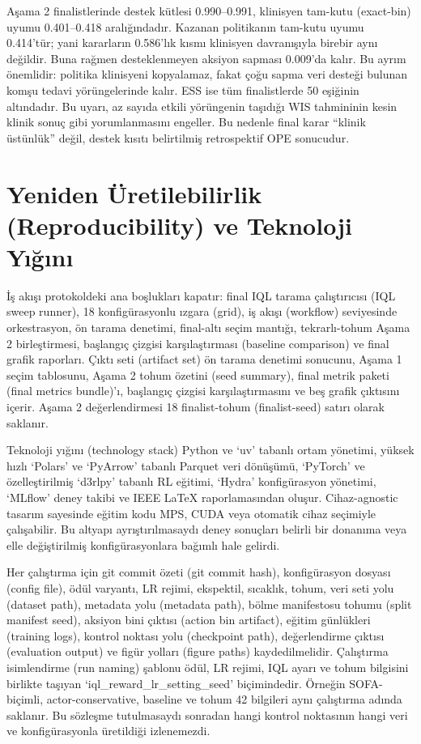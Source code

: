\documentclass[conference]{IEEEtran}
\begin{document}
Aşama 2 finalistlerinde destek kütlesi 0.990--0.991, klinisyen tam-kutu (exact-bin) uyumu 0.401--0.418 aralığındadır. Kazanan politikanın tam-kutu uyumu 0.414'tür; yani kararların 0.586'lık kısmı klinisyen davranışıyla birebir aynı değildir. Buna rağmen desteklenmeyen aksiyon sapması 0.009'da kalır. Bu ayrım önemlidir: politika klinisyeni kopyalamaz, fakat çoğu sapma veri desteği bulunan komşu tedavi yörüngelerinde kalır. ESS ise tüm finalistlerde 50 eşiğinin altındadır. Bu uyarı, az sayıda etkili yörüngenin taşıdığı WIS tahmininin kesin klinik sonuç gibi yorumlanmasını engeller. Bu nedenle final karar ``klinik üstünlük'' değil, destek kısıtı belirtilmiş retrospektif OPE sonucudur.

\section{Yeniden Üretilebilirlik (Reproducibility) ve Teknoloji Yığını}
İş akışı protokoldeki ana boşlukları kapatır: final IQL tarama çalıştırıcısı (IQL sweep runner), 18 konfigürasyonlu ızgara (grid), iş akışı (workflow) seviyesinde orkestrasyon, ön tarama denetimi, final-altı seçim mantığı, tekrarlı-tohum Aşama 2 birleştirmesi, başlangıç çizgisi karşılaştırması (baseline comparison) ve final grafik raporları. Çıktı seti (artifact set) ön tarama denetimi sonucunu, Aşama 1 seçim tablosunu, Aşama 2 tohum özetini (seed summary), final metrik paketi (final metrics bundle)'ı, başlangıç çizgisi karşılaştırmasını ve beş grafik çıktısını içerir. Aşama 2 değerlendirmesi 18 finalist-tohum (finalist-seed) satırı olarak saklanır.

Teknoloji yığını (technology stack) Python ve `uv' tabanlı ortam yönetimi, yüksek hızlı `Polars' ve `PyArrow' tabanlı Parquet veri dönüşümü, `PyTorch' ve özelleştirilmiş `d3rlpy' tabanlı RL eğitimi, `Hydra' konfigürasyon yönetimi, `MLflow' deney takibi ve IEEE LaTeX raporlamasından oluşur. Cihaz-agnostic tasarım sayesinde eğitim kodu MPS, CUDA veya otomatik cihaz seçimiyle çalışabilir. Bu altyapı ayrıştırılmasaydı deney sonuçları belirli bir donanıma veya elle değiştirilmiş konfigürasyonlara bağımlı hale gelirdi.

Her çalıştırma için git commit özeti (git commit hash), konfigürasyon dosyası (config file), ödül varyantı, LR rejimi, ekspektil, sıcaklık, tohum, veri seti yolu (dataset path), metadata yolu (metadata path), bölme manifestosu tohumu (split manifest seed), aksiyon bini çıktısı (action bin artifact), eğitim günlükleri (training logs), kontrol noktası yolu (checkpoint path), değerlendirme çıktısı (evaluation output) ve figür yolları (figure paths) kaydedilmelidir. Çalıştırma isimlendirme (run naming) şablonu ödül, LR rejimi, IQL ayarı ve tohum bilgisini birlikte taşıyan `iql\_reward\_lr\_setting\_seed' biçimindedir. Örneğin SOFA-biçimli, actor-conservative, baseline ve tohum 42 bilgileri aynı çalıştırma adında saklanır. Bu sözleşme tutulmasaydı sonradan hangi kontrol noktasının hangi veri ve konfigürasyonla üretildiği izlenemezdi.
\end{document}
